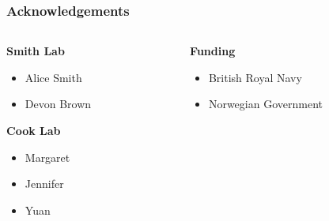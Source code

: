 \documentclass[
	8pt, %
]{beamer}
\begin{document}

\begin{frame}
	\frametitle{Acknowledgements}

	\begin{columns}[t] %
		\begin{column}{0.45\textwidth} %
			\textbf{Smith Lab}
			\begin{itemize}
				\item Alice Smith
				\item Devon Brown
			\end{itemize}
			\textbf{Cook Lab}
			\begin{itemize}
				\item Margaret
				\item Jennifer
				\item Yuan
			\end{itemize}
		\end{column}
		\begin{column}{0.5\textwidth} %
			\textbf{Funding}
			\begin{itemize}
				\item British Royal Navy
				\item Norwegian Government
			\end{itemize}
		\end{column}
	\end{columns}
\end{frame}

%
%
%
%
%
\end{document}

